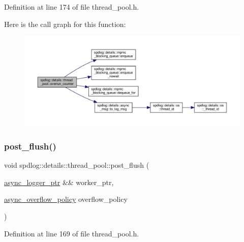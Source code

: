 Definition at line 174 of file thread\+\_\+pool.\+h.

Here is the call graph for this function\+:
\nopagebreak
\begin{figure}[H]
\begin{center}
\leavevmode
\includegraphics[width=350pt]{classspdlog_1_1details_1_1thread__pool_adc34920f65797d8f54986dc1894a8804_cgraph}
\end{center}
\end{figure}
\mbox{\label{classspdlog_1_1details_1_1thread__pool_aa851092603e816f78dd81bb980232048}} 
\subsubsection{\texorpdfstring{post\+\_\+flush()}{post\_flush()}}
{\footnotesize\ttfamily void spdlog\+::details\+::thread\+\_\+pool\+::post\+\_\+flush (\begin{DoxyParamCaption}\item[{\hyperlink{namespacespdlog_1_1details_a9b6989c16b6150f7e4658ea2aee01bc2}{async\+\_\+logger\+\_\+ptr} \&\&}]{worker\+\_\+ptr,  }\item[{\hyperlink{namespacespdlog_a42e109759a11c9514d3f6313a7709852}{async\+\_\+overflow\+\_\+policy}}]{overflow\+\_\+policy }\end{DoxyParamCaption})\hspace{0.3cm}{\ttfamily [inline]}}



Definition at line 169 of file thread\+\_\+pool.\+h.

\mbox{\label{classspdlog_1_1details_1_1thread__pool_a70cc09729d82174d84640eaface150e0}} 
